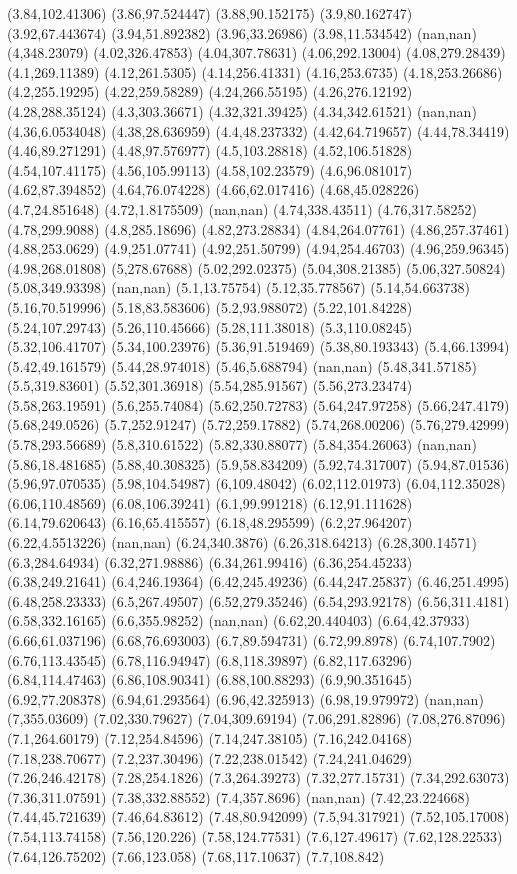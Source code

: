 (3.84,102.41306) (3.86,97.524447) (3.88,90.152175) (3.9,80.162747) (3.92,67.443674) (3.94,51.892382) (3.96,33.26986) (3.98,11.534542) (nan,nan) (4,348.23079) (4.02,326.47853) (4.04,307.78631) (4.06,292.13004) (4.08,279.28439) (4.1,269.11389) (4.12,261.5305) (4.14,256.41331) (4.16,253.6735) (4.18,253.26686) (4.2,255.19295) (4.22,259.58289) (4.24,266.55195) (4.26,276.12192) (4.28,288.35124) (4.3,303.36671) (4.32,321.39425) (4.34,342.61521) (nan,nan) (4.36,6.0534048) (4.38,28.636959) (4.4,48.237332) (4.42,64.719657) (4.44,78.34419) (4.46,89.271291) (4.48,97.576977) (4.5,103.28818) (4.52,106.51828) (4.54,107.41175) (4.56,105.99113) (4.58,102.23579) (4.6,96.081017) (4.62,87.394852) (4.64,76.074228) (4.66,62.017416) (4.68,45.028226) (4.7,24.851648) (4.72,1.8175509) (nan,nan) (4.74,338.43511) (4.76,317.58252) (4.78,299.9088) (4.8,285.18696) (4.82,273.28834) (4.84,264.07761) (4.86,257.37461) (4.88,253.0629) (4.9,251.07741) (4.92,251.50799) (4.94,254.46703) (4.96,259.96345) (4.98,268.01808) (5,278.67688) (5.02,292.02375) (5.04,308.21385) (5.06,327.50824) (5.08,349.93398) (nan,nan) (5.1,13.75754) (5.12,35.778567) (5.14,54.663738) (5.16,70.519996) (5.18,83.583606) (5.2,93.988072) (5.22,101.84228) (5.24,107.29743) (5.26,110.45666) (5.28,111.38018) (5.3,110.08245) (5.32,106.41707) (5.34,100.23976) (5.36,91.519469) (5.38,80.193343) (5.4,66.13994) (5.42,49.161579) (5.44,28.974018) (5.46,5.688794) (nan,nan) (5.48,341.57185) (5.5,319.83601) (5.52,301.36918) (5.54,285.91567) (5.56,273.23474) (5.58,263.19591) (5.6,255.74084) (5.62,250.72783) (5.64,247.97258) (5.66,247.4179) (5.68,249.0526) (5.7,252.91247) (5.72,259.17882) (5.74,268.00206) (5.76,279.42999) (5.78,293.56689) (5.8,310.61522) (5.82,330.88077) (5.84,354.26063) (nan,nan) (5.86,18.481685) (5.88,40.308325) (5.9,58.834209) (5.92,74.317007) (5.94,87.01536) (5.96,97.070535) (5.98,104.54987) (6,109.48042) (6.02,112.01973) (6.04,112.35028) (6.06,110.48569) (6.08,106.39241) (6.1,99.991218) (6.12,91.111628) (6.14,79.620643) (6.16,65.415557) (6.18,48.295599) (6.2,27.964207) (6.22,4.5513226) (nan,nan) (6.24,340.3876) (6.26,318.64213) (6.28,300.14571) (6.3,284.64934) (6.32,271.98886) (6.34,261.99416) (6.36,254.45233) (6.38,249.21641) (6.4,246.19364) (6.42,245.49236) (6.44,247.25837) (6.46,251.4995) (6.48,258.23333) (6.5,267.49507) (6.52,279.35246) (6.54,293.92178) (6.56,311.4181) (6.58,332.16165) (6.6,355.98252) (nan,nan) (6.62,20.440403) (6.64,42.37933) (6.66,61.037196) (6.68,76.693003) (6.7,89.594731) (6.72,99.8978) (6.74,107.7902) (6.76,113.43545) (6.78,116.94947) (6.8,118.39897) (6.82,117.63296) (6.84,114.47463) (6.86,108.90341) (6.88,100.88293) (6.9,90.351645) (6.92,77.208378) (6.94,61.293564) (6.96,42.325913) (6.98,19.979972) (nan,nan) (7,355.03609) (7.02,330.79627) (7.04,309.69194) (7.06,291.82896) (7.08,276.87096) (7.1,264.60179) (7.12,254.84596) (7.14,247.38105) (7.16,242.04168) (7.18,238.70677) (7.2,237.30496) (7.22,238.01542) (7.24,241.04629) (7.26,246.42178) (7.28,254.1826) (7.3,264.39273) (7.32,277.15731) (7.34,292.63073) (7.36,311.07591) (7.38,332.88552) (7.4,357.8696) (nan,nan) (7.42,23.224668) (7.44,45.721639) (7.46,64.83612) (7.48,80.942099) (7.5,94.317921) (7.52,105.17008) (7.54,113.74158) (7.56,120.226) (7.58,124.77531) (7.6,127.49617) (7.62,128.22533) (7.64,126.75202) (7.66,123.058) (7.68,117.10637) (7.7,108.842) 